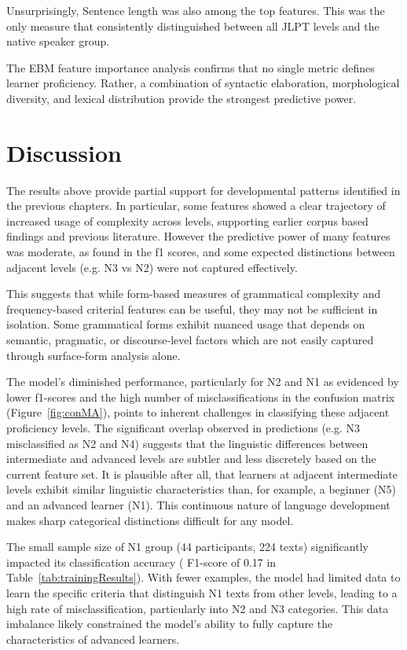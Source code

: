 Unsurprisingly, Sentence length was also among the top features. This was the only measure that consistently
distinguished between all JLPT levels and the native speaker group.

The EBM feature importance analysis confirms that no single metric defines learner proficiency. Rather, a
combination of syntactic elaboration, morphological diversity, and lexical distribution provide the strongest
predictive power.

\section{Discussion}

The results above provide partial support for developmental patterns identified in the previous chapters. In
particular, some features showed a clear trajectory of increased usage of complexity across levels, supporting
earlier corpus based findings and previous literature. However the predictive power of many features was moderate,
as found in the f1 scores, and some expected distinctions between adjacent levels (e.g. N3 vs N2) were not captured
effectively.

This suggests that while form-based measures of grammatical complexity and frequency-based criterial features can be
useful, they may not be sufficient in isolation. Some grammatical forms exhibit nuanced usage that depends on
semantic, pragmatic, or discourse-level factors which are not easily captured through surface-form
analysis alone.

The model's diminished performance, particularly for N2 and N1 as evidenced by lower f1-scores and the high number
of misclassifications in the confusion matrix (Figure~\ref{fig:conMA}), points to inherent challenges in
classifying these adjacent proficiency levels. The significant overlap observed in predictions (e.g. N3 misclassified
as N2 and N4) suggests that the linguistic differences between intermediate and advanced levels are subtler and less
discretely based on the current feature set. It is plausible after all, that learners at adjacent intermediate
levels exhibit similar linguistic characteristics than, for example, a beginner (N5) and an advanced learner (N1).
This continuous nature of language development makes sharp categorical distinctions difficult for any model.

The small sample size of N1 group (44 participants, 224 texts) significantly impacted its classification accuracy (
F1-score
of 0.17 in Table~\ref{tab:trainingResults}). With fewer examples, the model had limited data to learn the specific
criteria that distinguish N1 texts from other levels, leading to a high rate of misclassification, particularly into
N2 and N3 categories. This data imbalance likely constrained the model's ability to fully capture the
characteristics of advanced learners.


